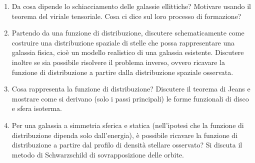 \begin{enumerate}
    \item Da cosa dipende lo schiacciamento delle galassie ellittiche? Motivare usando il teorema del viriale tensoriale. Cosa ci dice sul loro processo di formazione?
    \item Partendo da una funzione di distribuzione, discutere schematicamente come costruire una distribuzione spaziale di stelle che possa rappresentare una galassia fisica, cioè un modello realistico di una galassia esistente. Discutere inoltre se sia possibile risolvere il problema inverso, ovvero ricavare la funzione di distribuzione a partire dalla distribuzione spaziale osservata.
    \item Cosa rappresenta la funzione di distribuzione? Discutere il teorema di Jeans e mostrare come si derivano (solo i passi principali) le forme funzionali di disco e sfera isoterma.
    \item Per una galassia a simmetria sferica e statica (nell’ipotesi che la funzione di distribuzione dipenda solo dall’energia), è possibile ricavare la funzione di distribuzione a partire dal profilo di densità stellare osservato? Si discuta il metodo di Schwarzschild di sovrapposizione delle orbite.
\end{enumerate}